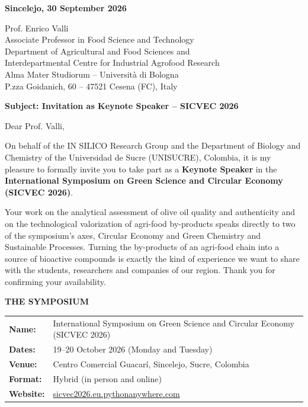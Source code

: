 \documentclass[11pt,a4paper]{article}
\begin{document}
\vspace{0.1cm}

\noindent
\textbf{Sincelejo, 30 September 2026}

\vspace{0.1cm}

\noindent
Prof. Enrico Valli\\
Associate Professor in Food Science and Technology\\
Department of Agricultural and Food Sciences and\\
Interdepartmental Centre for Industrial Agrofood Research\\
Alma Mater Studiorum -- Università di Bologna\\
P.zza Goidanich, 60 -- 47521 Cesena (FC), Italy

\vspace{0.1cm}

\noindent
\textbf{\large Subject: Invitation as Keynote Speaker -- SICVEC 2026}

\vspace{0.1cm}

Dear Prof. Valli,

On behalf of the IN SILICO Research Group and the Department of Biology and Chemistry of the Universidad de Sucre (UNISUCRE), Colombia, it is my pleasure to formally invite you to take part as a \textbf{Keynote Speaker} in the \textbf{International Symposium on Green Science and Circular Economy (SICVEC 2026)}.

Your work on the analytical assessment of olive oil quality and authenticity and on the technological valorization of agri-food by-products speaks directly to two of the symposium's axes, Circular Economy and Green Chemistry and Sustainable Processes. Turning the by-products of an agri-food chain into a source of bioactive compounds is exactly the kind of experience we want to share with the students, researchers and companies of our region. Thank you for confirming your availability.

\vspace{0.1cm}

\noindent
\textbf{THE SYMPOSIUM}

\begin{tabular}{ll}
\textbf{Name:} & International Symposium on Green Science and Circular Economy (SICVEC 2026) \\
\textbf{Dates:} & 19--20 October 2026 (Monday and Tuesday) \\
\textbf{Venue:} & Centro Comercial Guacarí, Sincelejo, Sucre, Colombia \\
\textbf{Format:} & Hybrid (in person and online) \\
\textbf{Website:} & \href{https://sicvec2026.eu.pythonanywhere.com}{sicvec2026.eu.pythonanywhere.com} \\
\end{tabular}
\end{document}
